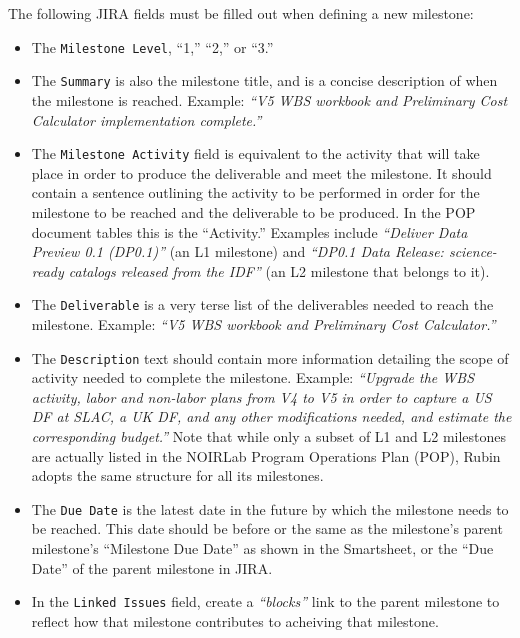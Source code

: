 \begin{itemize}
The following \gls{JIRA} fields must be filled out when defining a new milestone:
\begin{itemize}
\item The \texttt{Milestone Level}, ``1,'' ``2,'' or ``3.''
\item The \texttt{Summary} is also the milestone title, and is a concise description of when the milestone is reached.
Example: \textit{``V5 WBS workbook and Preliminary Cost Calculator implementation complete.''}
\item The \texttt{Milestone Activity} field is equivalent to the activity that will take place in order to produce the deliverable and meet the milestone.  It should contain a sentence outlining the activity to be performed in order for the milestone to be reached and the deliverable to be produced. In the POP document tables this is the ``Activity.''
  Examples include \textit{``Deliver Data Preview 0.1 (DP0.1)''} (an L1 milestone) and \textit{``DP0.1 Data Release: science-ready catalogs released from the IDF''} (an L2 milestone that belongs to it).
\item The \texttt{Deliverable} is a very terse list of the deliverables needed to reach the milestone.
  Example: \textit{``V5 WBS workbook and Preliminary Cost Calculator.''}
\item The \texttt{Description} text should contain more information detailing the scope of activity needed to complete the milestone.
  Example: \textit{``Upgrade the WBS activity, labor and non-labor plans from V4 to V5 in order to capture a US DF at SLAC, a UK DF, and any other modifications needed, and estimate the corresponding budget.''}
  Note that while only a subset of L1 and L2 milestones are actually listed in the NOIRLab Program Operations Plan (POP), Rubin adopts the same structure for all its milestones.
\item The \texttt{Due Date} is the latest date in the future by which the milestone needs to be reached.
  This date should be before or the same as the milestone's parent milestone's ``Milestone Due Date'' as shown in the Smartsheet, or the ``Due Date'' of the parent milestone in \gls{JIRA}.
\item In the \texttt{Linked Issues} field, create a \textit{``blocks''} link to the parent milestone to reflect how that milestone contributes to acheiving that milestone.
\end{itemize}


\end{itemize}
